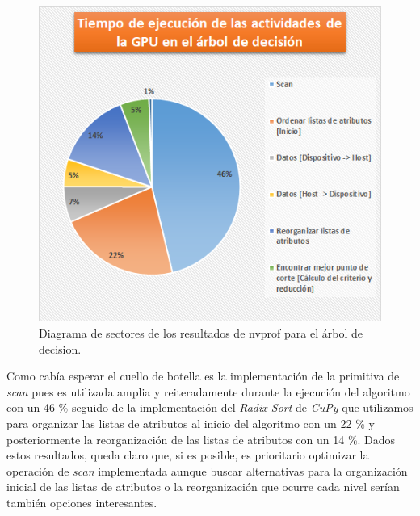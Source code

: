 \begin{figure}[ht]
\centering
\includegraphics[scale=0.9]{imagenes/profiletreequesito.png}
\caption{Diagrama de sectores de los resultados de nvprof para el árbol de decision.}
\label{img:treequesito}
\end{figure}

Como cabía esperar el cuello de botella es la implementación de la primitiva de \textit{scan} pues es utilizada amplia y reiteradamente durante la ejecución del algoritmo con un 46 \% seguido de la implementación del \textit{Radix Sort} de \textit{CuPy} que utilizamos para organizar las listas de atributos al inicio del algoritmo con un 22 \% y posteriormente la reorganización de las listas de atributos con un 14 \%. Dados estos resultados, queda claro que, si es posible, es prioritario optimizar la operación de \textit{scan} implementada aunque buscar alternativas para la organización inicial de las listas de atributos o la reorganización que ocurre cada nivel serían también opciones interesantes.